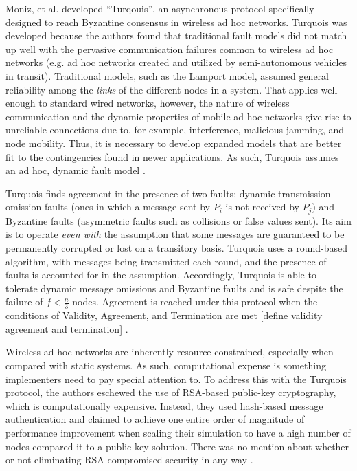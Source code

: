 \documentclass[twoside, conference]{IEEEtran}
\begin{document}
Moniz, et al. developed ``Turqouis'', an asynchronous protocol specifically designed to reach Byzantine consensus in wireless ad hoc networks. Turquois was developed because the authors found that traditional fault models did not match up well with the pervasive communication failures common to wireless ad hoc networks (e.g. ad hoc networks created and utilized by semi-autonomous vehicles in transit). Traditional models, such as the Lamport model, assumed general reliability among the \textit{links} of the different nodes in a system. That applies well enough to standard wired networks, however, the nature of wireless communication and the dynamic properties of mobile ad hoc networks give rise to unreliable connections due to, for example, interference, malicious jamming, and node mobility. Thus, it is necessary to develop expanded models that are better fit to the contingencies found in newer applications. As such, Turquois assumes an ad hoc, dynamic fault model \cite{Moniz2013}.

Turquois finds agreement in the presence of two faults: dynamic transmission omission faults (ones in which a message sent by $P_i$ is not received by $P_j$) and Byzantine faults (asymmetric faults such as collisions or false values sent). Its aim is to operate \textit{even with} the assumption that some messages are guaranteed to be permanently corrupted or lost on a transitory basis. Turquois uses a  round-based algorithm, with messages being transmitted each round, and the presence of faults is accounted for in the assumption. Accordingly, Turquois is able to tolerate dynamic message omissions and Byzantine faults and is safe despite the failure of $f < \frac{n}{3}$ nodes. Agreement is reached under this protocol when the conditions of Validity, Agreement, and Termination are met [define validity agreement and termination] \cite{Moniz2013}.

Wireless ad hoc networks are inherently resource-constrained, especially when compared with static systems. As such, computational expense is something implementers need to pay special attention to. To address this with the Turquois protocol, the authors eschewed the use of RSA-based public-key cryptography, which is computationally expensive. Instead, they used hash-based message authentication and claimed to achieve one entire order of magnitude of performance improvement when scaling their simulation to have a high number of nodes compared it to a public-key solution. There was no mention about whether or not eliminating RSA compromised security in any way \cite{Moniz2013}.
\end{document}
